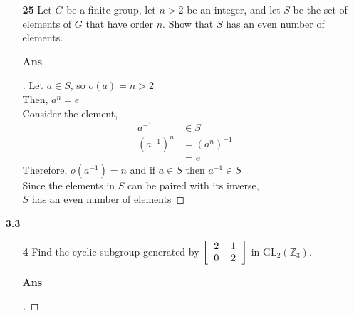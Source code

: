 \documentclass[paper=usletter, fontsize=12pt]{article}
\begin{document}
\begin{itemize}
\begin{itemize}
            \item[\textbf{25}] Let $G$ be a finite group, let $n > 2$ be an
            integer, and let $S$ be the set of elements of $G$ that have order
            $n$. Show that $S$ has an even number of elements.
            \item[\textbf{Ans}]
            \begin{proof}[\unskip\nopunct]

                Let $a \in S$, so $o(a)=n>2$\\
                Then, $a^n=e$\\
                Consider the element,
                \begin{align*}
                    a^{-1} & \in S\\
                    (a^{-1})^{n} & = (a^{n})^{-1}\\
                    & = e
                \end{align*}
                Therefore, $o(a^{-1})=n$ and if $a \in S$ then $a^{-1} \in S$\\
                Since the elements in $S$ can be paired with its inverse,\\
                $S$ has an even number of elements \qedhere

            \end{proof}
            \vspace{0.2in}

        \end{itemize}

        \item[\textbf{3.3}]
        \begin{itemize}

            \item[\textbf{4}] Find the cyclic subgroup generated by $\left[\begin{tabular}{cc}
                2 & 1 \\
                0 & 2
            \end{tabular}\right]$ in $\text{GL}_2(\mathbb{Z}_3)$.
            \item[\textbf{Ans}]
            \begin{proof}[\unskip\nopunct]


\end{proof}
\end{itemize}
\end{itemize}
\end{document}
